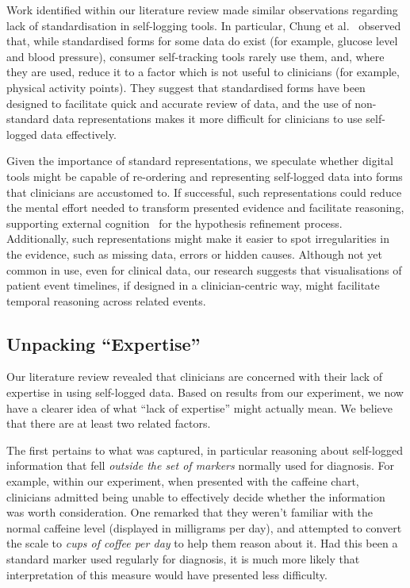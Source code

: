 \documentclass{sigchi}
\begin{document}
Work identified within our literature review made similar observations regarding lack of standardisation in self-logging tools. In particular, Chung et al.\ \cite{chung_more_2015} observed that, while standardised forms for some data do exist (for example, glucose level and blood pressure), consumer self-tracking tools rarely use them, and, where they are used, reduce it to a factor which is not useful to clinicians (for example, physical activity points). They suggest that standardised forms have been designed to facilitate quick and accurate review of data, and the use of non-standard data representations makes it more difficult for clinicians to use self-logged data effectively.

Given the importance of standard representations, we speculate whether digital tools might be capable of re-ordering and representing self-logged data into forms that clinicians are accustomed to.  If successful, such representations could reduce the mental effort needed to transform presented evidence and facilitate reasoning, supporting external cognition~\cite{extcog} for the hypothesis refinement process.  Additionally, such representations might make it easier to spot irregularities in the evidence, such as missing data, errors or hidden causes.  Although not yet common in use, even for clinical data, our research suggests that visualisations of patient event timelines, if designed in a clinician-centric way, might facilitate temporal reasoning across related events.

\subsection{Unpacking ``Expertise''}

Our literature review revealed that clinicians are concerned with their lack of expertise in using self-logged data. Based on results from our experiment, we now have a clearer idea of what ``lack of expertise'' might actually mean.  We believe that there are at least two related factors.

The first pertains to what was captured, in particular reasoning about self-logged information that fell \emph{outside the set of markers} normally used for diagnosis.  For example, within our experiment, when presented with the caffeine chart, clinicians admitted being unable to effectively decide whether the information was worth consideration.  One remarked that they weren't familiar with the normal caffeine level (displayed in milligrams per day), and attempted to convert the scale to \emph{cups of coffee per day} to help them reason about it.  Had this been a standard marker used regularly for diagnosis, it is much more likely that interpretation of this measure would have presented less difficulty.
\end{document}
